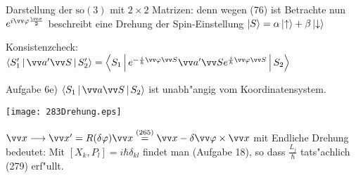 \documentclass[a4paper]{scrartcl}
\begin{document}
{Darstellung der $\mathrm{so}(3)$ mit $2 \times 2$ Matrizen:
denn wegen (76) ist 
Betrachte nun
$e^{i \vv \phi \frac{ \vv \sigma}2}$ beschreibt eine Drehung der Spin-Einstellung $ \Ket S = \alpha \Ket \uparrow + \beta \Ket \downarrow$

Konsistenzcheck: $\Braket{ S_1' | \vv a' \vv S | S_2'} = \Braket{ S_1 | e^{- \frac i \hbar \vv \phi \vv S} \vv a' \vv S e^{\frac i \hbar \vv \phi \vv S} | S_2}$

Aufgabe 6e) $\Braket{ S_1 | \vv a \vv S | S_2 }$ ist unabh"angig vom Koordinatensystem.
\begin{center}
\texttt{[image: 283Drehung.eps]}
\end{center}
$\vv x \longrightarrow \vv x ' = R( \delta \phi) \vv x \stackrel{(265)}= \vv x - \delta \vv \phi \times \vv x$
mit
Endliche Drehung
bedeutet:
Mit $[X_k, P_l] = i \hbar \delta_{kl}$ findet man
(Aufgabe 18), so dass $\frac{L_j}\hbar$ tats"achlich (279) erf"ullt.

}
\end{document}
